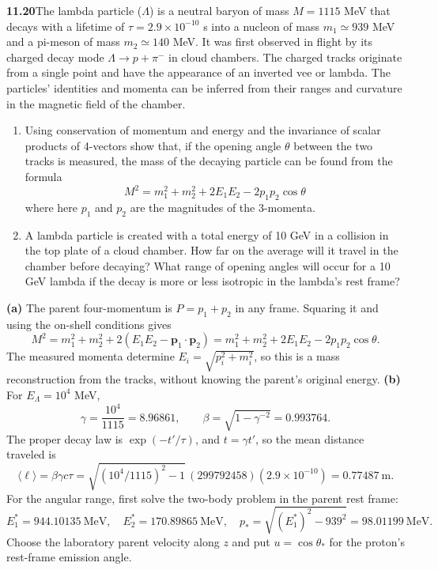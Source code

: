 \par\bigskip
\noindent\textbf{11.20}\quad The lambda particle ($\Lambda$) is a neutral baryon of mass $M=1115$ MeV that decays with a lifetime of $\tau=2.9\times10^{-10}$ s into a nucleon of mass $m_{1}\simeq939$ MeV and a pi-meson of mass $m_{2}\simeq140$ MeV. It was first observed in flight by its charged decay mode $\Lambda\to p+\pi^{-}$ in cloud chambers. The charged tracks originate from a single point and have the appearance of an inverted vee or lambda. The particles' identities and momenta can be inferred from their ranges and curvature in the magnetic field of the chamber.
\begin{enumerate}
\item[(a)] Using conservation of momentum and energy and the invariance of scalar products of 4-vectors show that, if the opening angle $\theta$ between the two tracks is measured, the mass of the decaying particle can be found from the formula
\[
M^{2}=m_{1}^{2}+m_{2}^{2}+2E_{1}E_{2}-2p_{1}p_{2}\cos\theta
\]
where here $p_{1}$ and $p_{2}$ are the magnitudes of the 3-momenta.
\item[(b)] A lambda particle is created with a total energy of 10 GeV in a collision in the top plate of a cloud chamber. How far on the average will it travel in the chamber before decaying? What range of opening angles will occur for a 10 GeV lambda if the decay is more or less isotropic in the lambda's rest frame?
\end{enumerate}
\solution
\textbf{(a)} The parent four-momentum is $P=p_1+p_2$ in
any frame. Squaring it and using the on-shell conditions gives
\[
\boxed{M^2=m_1^2+m_2^2+2(E_1E_2-\mathbf p_1\cdot\mathbf p_2)
=m_1^2+m_2^2+2E_1E_2-2p_1p_2\cos\theta.}
\]
The measured momenta determine $E_i=\sqrt{p_i^2+m_i^2}$, so this
is a mass reconstruction from the tracks, without knowing the
parent's original energy.
\textbf{(b)} For $E_\Lambda=10^4$ MeV,
\[
\gamma=\frac{10^4}{1115}=8.96861,\qquad
\beta=\sqrt{1-\gamma^{-2}}=0.993764.
\]
The proper decay law is $\exp(-t'/\tau)$, and $t=\gamma t'$,
so the mean distance traveled is
\[
\boxed{\langle\ell\rangle=\beta\gamma c\tau
=\sqrt{(10^4/1115)^2-1}\,(299792458)(2.9\times10^{-10})
=0.77487\ \mathrm m.}
\]
For the angular range, first solve the two-body problem in the
parent rest frame:
\[
E_1^*=944.10135\ \mathrm{MeV},\quad
E_2^*=170.89865\ \mathrm{MeV},\quad
p_* =\sqrt{(E_1^*)^2-939^2}=98.01199\ \mathrm{MeV}.
\]
Choose the laboratory parent velocity along $z$ and put
$u=\cos\theta_*$ for the proton's rest-frame emission angle.
